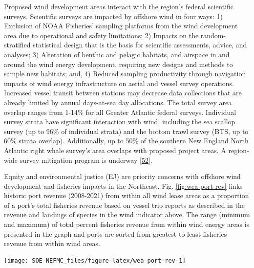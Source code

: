 \documentclass[
  10pt,
]{article}
\let\origfigure\figure
\let\endorigfigure\endfigure
\renewenvironment{figure}[1][2] {
    \expandafter\origfigure\expandafter[H]
} {
    \endorigfigure
}
\begin{document}
Proposed wind development areas interact with the region's federal scientific surveys. Scientific surveys are impacted by offshore wind in four ways: 1) Exclusion of NOAA Fisheries' sampling platforms from the wind development area due to operational and safety limitations; 2) Impacts on the random-stratified statistical design that is the basis for scientific assessments, advice, and analyses; 3) Alteration of benthic and pelagic habitats, and airspace in and around the wind energy development, requiring new designs and methods to sample new habitats; and, 4) Reduced sampling productivity through navigation impacts of wind energy infrastructure on aerial and vessel survey operations. Increased vessel transit between stations may decrease data collections that are already limited by annual days-at-sea day allocations. The total survey area overlap ranges from 1-14\% for all Greater Atlantic federal surveys. Individual survey strata have significant interaction with wind, including the sea scallop survey (up to 96\% of individual strata) and the bottom trawl survey (BTS, up to 60\% strata overlap). Additionally, up to 50\% of the southern New England North Atlantic right whale survey's area overlaps with proposed project areas. A region-wide survey mitigation program is underway {[}\protect\hyperlink{ref-northeast_fisheries_science_center_us_noaa_2022}{52}{]}.

Equity and environmental justice (EJ) are priority concerns with offshore wind development and fisheries impacts in the Northeast. Fig. \ref{fig:wea-port-rev} links historic port revenue (2008-2021) from within all wind lease areas as a proportion of a port's total fisheries revenue based on vessel trip reports as described in the revenue and landings of species in the wind indicator above. The range (minimum and maximum) of total percent fisheries revenue from within wind energy areas is presented in the graph and ports are sorted from greatest to least fisheries revenue from within wind areas.

\begin{figure}

\texttt{[image: SOE-NEFMC\_files/figure-latex/wea-port-rev-1]} \hfill{}

\caption{Percent of port fisheries revenue from Wind Energy Areas (WEA) in descending order from most to least port fisheries revenue from WEA. EJ = Environmental Justice.}\label{fig:wea-port-rev}
\end{figure}
\end{document}
